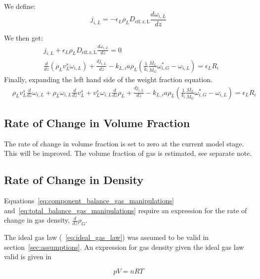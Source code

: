 \documentclass{article}
\begin{document}
We define:
\begin{equation}
	j_{i,L} = - \epsilon_L \rho_L D_{\mathrm{eff,z,L}}\frac{d\omega_{i,L}}{dz}
\end{equation}

We then get:
\begin{equation}
	\begin{split}
	& j_{i,L} + \epsilon_L \rho_L D_{\mathrm{eff,z,L}}\frac{d\omega_{i,L}}{dz} = 0\\
	&\frac{d}{dz}\left(\rho_L v_L^s \omega_{i,L} \right) + \frac{dj_{i,L}}{dz} - k_{L,i}a\rho_L(\frac{1}{k_i}\frac{\overline{M_L}}{\overline{M_G}}\omega_{i,G}^*-\omega_{i,L}) = \epsilon_LR_i 
	\end{split}
\end{equation}
Finally, expanding the left hand side of the weight fraction equation.
	\begin{equation}
	\begin{split}
	&\rho_Lv_L^s\frac{d}{dz}\omega_{i,L} + \rho_L\omega_{i,L} \frac{d}{dz}v_L^s + v_L^s \omega_{i,L} \frac{d}{dz}\rho_L + \frac{dj_{i,L}}{dz} - k_{L,i}a\rho_L(\frac{1}{k_i}\frac{\overline{M_L}}{\overline{M_G}}\omega_{i,G}^*-\omega_{i,L}) = \epsilon_LR_i 
	\end{split}
\end{equation}

\subsection{Rate of Change in Volume Fraction}
The rate of change in volume fraction is set to zero at the current model stage. This will be improved. The volume fraction of gas is estimated, see separate note.

\subsection{Rate of Change in Density}
Equations~\ref{eq:component_balance_gas_manipulations} and~\ref{eq:total_balance_gas_manipulations} require an expression for the rate of change in gas density, $\frac{d}{dz}\rho_G$.

The ideal gas law (~\ref{eq:ideal_gas_law}) was assumed to be valid in section~\ref{sec:assumptions}. An expression for gas density given the ideal gas law valid is given in 

\begin{equation}
	pV = nRT
	\label{eq:ideal_gas_law}
\end{equation}
\end{document}
